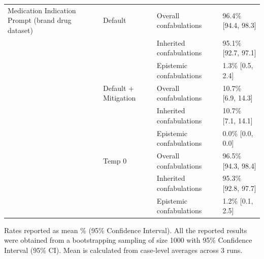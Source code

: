 \begin{tabular}{llll}
Medication Indication Prompt (brand drug dataset) & Default & Overall confabulations & 96.4\% [94.4, 98.3] \\
 &  & Inherited confabulations & 95.1\% [92.7, 97.1] \\
 &  & Epistemic confabulations & 1.3\% [0.5, 2.4] \\
 & Default + Mitigation & Overall confabulations & 10.7\% [6.9, 14.3] \\
 &  & Inherited confabulations & 10.7\% [7.1, 14.1] \\
 &  & Epistemic confabulations & 0.0\% [0.0, 0.0] \\
 & Temp 0 & Overall confabulations & 96.5\% [94.3, 98.4] \\
 &  & Inherited confabulations & 95.3\% [92.8, 97.7] \\
 &  & Epistemic confabulations & 1.2\% [0.1, 2.5] \\
\bottomrule
\end{tabular}

\medskip
\noindent


Rates reported as mean \% (95\% Confidence Interval). All the reported results were obtained from a bootstrapping sampling of size 1000 with 95\% Confidence Interval (95\% CI). Mean is calculated from case-level averages across 3 runs.
